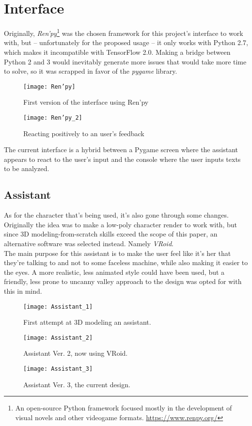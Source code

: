\section{Interface}
Originally, \textit{Ren'py}\footnote{An open-source Python framework focused mostly in the development of visual novels and other videogame formats. \url{https://www.renpy.org/}} was the chosen framework for this project's interface to work with, but -- unfortunately for the proposed usage -- it only works with Python 2.7, which makes it incompatible with TensorFlow 2.0. Making a bridge between Python 2 and 3 would inevitably generate more issues that would take more time to solve, so it was scrapped in favor of the \textit{pygame} library.
\pagebreak

\begin{figure}[!h]
	\centering
	\texttt{[image: Ren'py]}
	\caption{First version of the interface using Ren'py}
	\label{fig:renpy_test_1}
\end{figure}
\begin{figure}[!h]
	\centering
	\texttt{[image: Ren'py\_2]}
	\caption{Reacting positively to an user's feedback}
	\label{fig:renpy_test_2}
\end{figure}

The current interface is a hybrid between a Pygame screen where the assistant appears to react to the user's input and the console where the user inputs texts to be analyzed.
\pagebreak

\subsection{Assistant}
As for the character that's being used, it's also gone through some changes. Originally the idea was to make a low-poly character render to work with, but since 3D modeling-from-scratch skills exceed the scope of this paper, an alternative software was selected instead. Namely \textit{VRoid}.\\
The main purpose for this assistant is to make the user feel like it's her that they're talking to and not to some faceless machine, while also making it easier to the eyes. A more realistic, less animated style could have been used, but a friendly, less prone to uncanny valley approach to the design was opted for with this in mind.
\begin{figure}[!ht]
	\centering
	\texttt{[image: Assistant\_1]}
	\caption{First attempt at 3D modeling an assistant.}
	\label{fig:assistant1}
\end{figure}
\begin{figure}[!ht]
	\centering
	\texttt{[image: Assistant\_2]}
	\caption{Assistant Ver. 2, now using VRoid.}
	\label{fig:assistant2}
\end{figure}
\begin{figure}[!ht]
	\centering
	\texttt{[image: Assistant\_3]}
	\caption{Assistant Ver. 3, the current design.}
	\label{fig:assistant3}
\end{figure}


